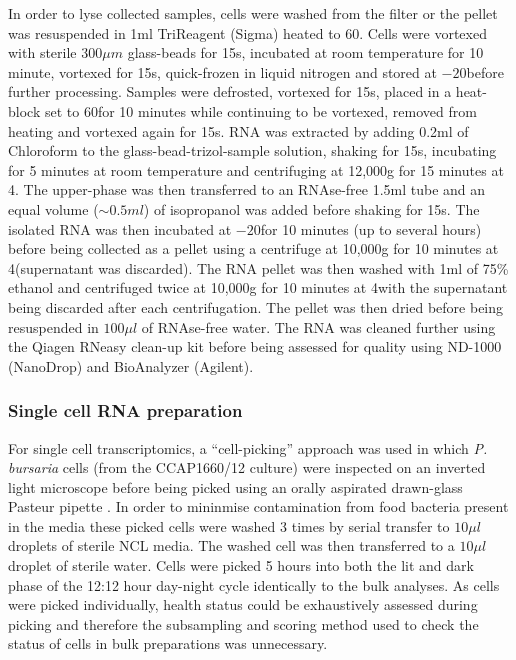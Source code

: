 In order to lyse collected samples, cells were washed from the filter or the 
pellet was resuspended in 1ml TriReagent (Sigma) heated to \(60\)\celsius. 
Cells were vortexed with sterile \(300\mu m\) glass-beads for 15s, incubated at 
room temperature for 10 minute, vortexed for 15s, quick-frozen in liquid 
nitrogen and stored at \(-20\)\celsius before further processing.  
Samples were defrosted, vortexed for 15s, placed in a heat-block set 
to \(60\)\celsius for 10 minutes while continuing to be vortexed, removed from 
heating and vortexed again for 15s.  
RNA was extracted by adding 0.2ml of Chloroform to the glass-bead-trizol-sample 
solution, shaking for 15s, incubating for 5 minutes at room temperature and 
centrifuging at 12,000g for 15 minutes at 4\celsius.  
The upper-phase was then transferred to an RNAse-free 1.5ml tube and an 
equal volume (\(\sim0.5ml\)) of isopropanol was added before shaking for 15s.  
The isolated RNA was then incubated at \(-20\)\celsius for 10 minutes 
(up to several hours) before being collected as a pellet using a centrifuge at 
10,000g for 10 minutes at 4\celsius (supernatant was discarded). 
The RNA pellet was then washed with 1ml of 75\% ethanol and centrifuged 
twice at 10,000g for 10 minutes at 4\celsius with the supernatant being 
discarded after each centrifugation.  
The pellet was then dried before being resuspended in \(100\mu l\) of RNAse-free water.  
The RNA was cleaned further using the Qiagen RNeasy clean-up kit 
before being assessed for quality using ND-1000 (NanoDrop) and BioAnalyzer (Agilent).

\subsubsection{Single cell RNA preparation}
For single cell transcriptomics, a ``cell-picking'' approach was used in which
\textit{P. bursaria} cells (from the CCAP1660/12 culture) were inspected on an inverted light microscope 
before being picked using an orally aspirated drawn-glass Pasteur pipette \citep{Garcia-Cuetos2012}.
In order to mininmise contamination from food bacteria present in the media these picked cells
were washed 3 times by serial transfer to \(10\mu l\) droplets of sterile NCL media.
The washed cell was then transferred to a \(10\mu l\) droplet of sterile water.
Cells were picked 5 hours into both the lit and dark phase of the 12:12 hour day-night cycle 
identically to the bulk analyses.
As cells were picked individually, health status could be exhaustively assessed
during picking and therefore the subsampling and scoring method used to
check the status of cells in bulk preparations was unnecessary.

